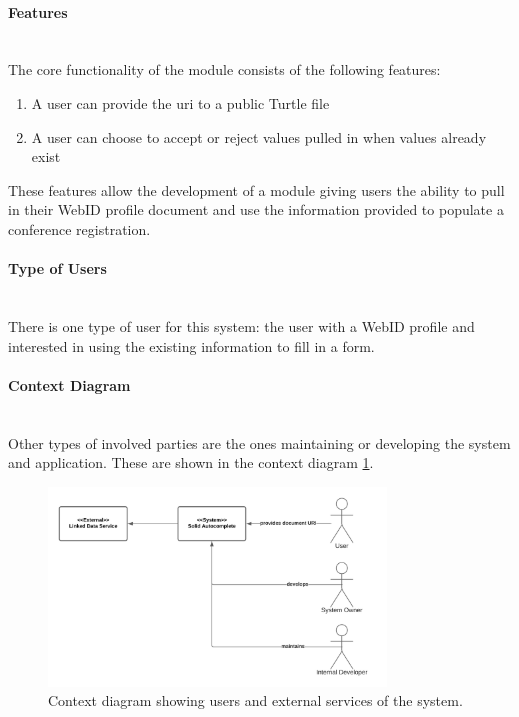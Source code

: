 \vspace{0.5cm}
\paragraph{Features}\mbox{}\\

The core functionality of the module consists of the following features: 

\vspace{-3mm}
\begin{enumerate}
    \item A user can provide the \gls{uri} to a public Turtle file
    \item A user can choose to accept or reject values pulled in when values already exist
\end{enumerate}
\vspace{-3mm}

These features allow the development of a module giving users the ability to pull in their WebID profile document and use the information provided to populate a conference registration.
\vspace{0.5cm}
\paragraph{Type of Users}\mbox{}\\

There is one type of user for this system: the user with a WebID profile and interested in using the existing information to fill in a form.
\vspace{0.5cm}
\paragraph{Context Diagram}\mbox{}\\

Other types of involved parties are the ones maintaining or developing the system and application. These are shown in the context diagram \ref{fig:poc-autocomplete-context_diagram}.

\begin{figure}[H]
    \centering
    \includegraphics[width=0.8\textwidth]{prototype/graphs/poc-autocomplete-context_diagram.png}
    \caption{Context diagram showing users and external services of the system.}
    \label{fig:poc-autocomplete-context_diagram}
\end{figure}
\vspace{0.5cm}
